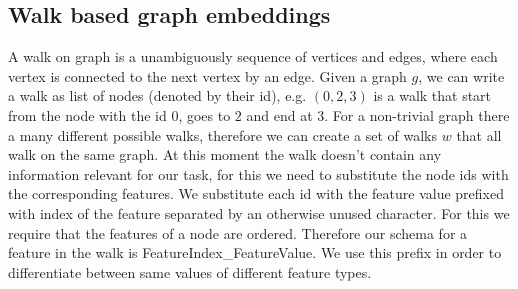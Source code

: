 \subsection{Walk based graph embeddings}
A walk on graph is a unambiguously sequence of vertices and edges, where each vertex is connected to the next vertex by an edge. Given a graph $g$, we can write a walk as list of nodes (denoted by their id), e.g. $(0, 2, 3)$ is a walk that start from the node with the id $0$, goes to $2$ and end at $3$. For a non-trivial graph there a many different possible walks, therefore we can create a set of walks $w$ that all walk on the same graph. At this moment the walk doesn't contain any information relevant for our task, for this we need to substitute the node ids with the corresponding features. We substitute each id with the feature value prefixed with index of the feature separated by an otherwise unused character. For this we require that the features of a node are ordered. Therefore our schema for a feature in the walk is FeatureIndex\_FeatureValue. We use this prefix in order to differentiate between same values of different feature types.

